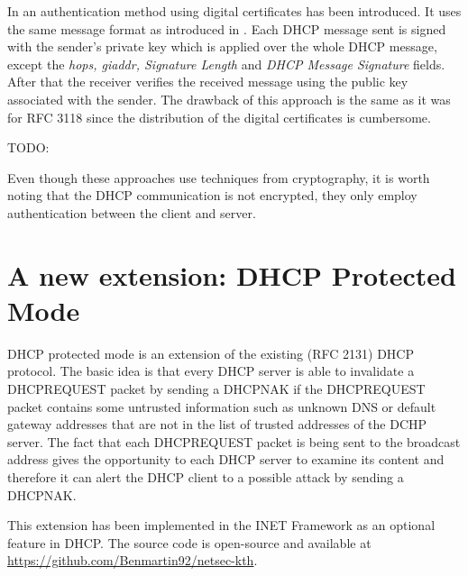 \documentclass[letterpaper, 10 pt, conference]{ieeeconf}  %
\begin{document}
In \cite{6866756} an authentication method using digital certificates has been introduced. It uses the same message format as introduced in \cite{dhcpauthrfc}. Each DHCP message sent is signed with the sender's private key which is applied over the whole DHCP message, except the \textit{hops, giaddr, Signature Length} and \textit{DHCP Message Signature} fields. After that the receiver verifies the received message using the public key associated with the sender. The drawback of this approach is the same as it was for RFC 3118 since the distribution of the digital certificates is cumbersome.

TODO:  \cite{7208238}

Even though these approaches use techniques from cryptography, it is worth noting that the DHCP communication is not encrypted, they only employ authentication between the client and server. 
\section{A new extension: DHCP Protected Mode}\label{sec:protected-mode}
DHCP protected mode is an extension of the existing (RFC 2131) DHCP protocol. The basic idea is that every DHCP server is able to invalidate a DHCPREQUEST packet by sending a DHCPNAK if the DHCPREQUEST packet contains some untrusted information such as unknown DNS or default gateway addresses that are not in the list of trusted addresses of the DCHP server. The fact that each DHCPREQUEST packet is being sent to the broadcast address gives the opportunity to each DHCP server to examine its content and therefore it can alert the DHCP client to a possible attack by sending a DHCPNAK.

This extension has been implemented in the INET Framework as an optional feature in DHCP. The source code is open-source and available at \url{https://github.com/Benmartin92/netsec-kth}.
\end{document}
